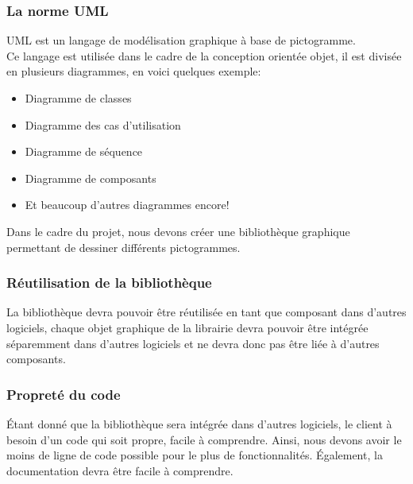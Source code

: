 \documentclass[12pt,a4paper,openany]{article}
\begin{document}
		\subsubsection{La norme UML} 
			UML est un langage de modélisation graphique à base de pictogramme.\\
			Ce langage est utilisée dans le cadre de la conception orientée objet, il est divisée en plusieurs diagrammes, en voici quelques exemple: 
			\begin{itemize}
				\item Diagramme de classes
				\item Diagramme des cas d'utilisation
				\item Diagramme de séquence
				\item Diagramme de composants
				\item Et beaucoup d'autres diagrammes encore! 
			\end{itemize}
			Dans le cadre du projet, nous devons créer une bibliothèque graphique permettant de dessiner différents pictogrammes.
		\subsubsection{Réutilisation de la bibliothèque}
		La bibliothèque devra pouvoir être réutilisée en tant que composant dans d'autres logiciels,
		chaque objet graphique de la librairie devra pouvoir être intégrée séparemment dans d'autres logiciels 
		et ne devra donc pas être liée à d'autres composants.
		\subsubsection{Propreté du code} Étant donné que la bibliothèque sera intégrée dans d'autres logiciels, le client
		à besoin d'un code qui soit propre, facile à comprendre. Ainsi, nous devons avoir le moins de ligne de code
		possible pour le plus de fonctionnalités. Également, la documentation devra être facile à comprendre.
\end{document}
